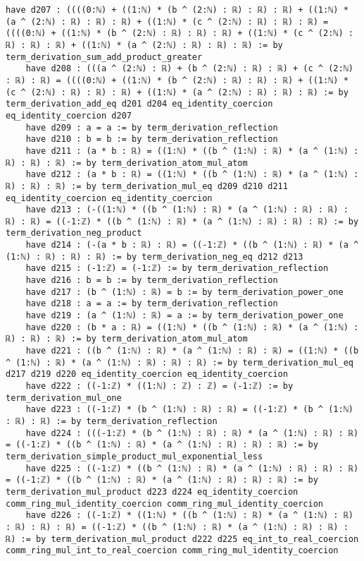 \documentclass{article}
\begin{document}
\begin{tcolorbox}[colback=white!10, width=\linewidth]
\begin{lstlisting}[language=Lean4]
    have d207 : ((((0:ℕ) + ((1:ℕ) * (b ^ (2:ℕ) : ℝ) : ℝ) : ℝ) + ((1:ℕ) * (a ^ (2:ℕ) : ℝ) : ℝ) : ℝ) + ((1:ℕ) * (c ^ (2:ℕ) : ℝ) : ℝ) : ℝ) = ((((0:ℕ) + ((1:ℕ) * (b ^ (2:ℕ) : ℝ) : ℝ) : ℝ) + ((1:ℕ) * (c ^ (2:ℕ) : ℝ) : ℝ) : ℝ) + ((1:ℕ) * (a ^ (2:ℕ) : ℝ) : ℝ) : ℝ) := by term_derivation_sum_add_product_greater
    have d208 : (((a ^ (2:ℕ) : ℝ) + (b ^ (2:ℕ) : ℝ) : ℝ) + (c ^ (2:ℕ) : ℝ) : ℝ) = ((((0:ℕ) + ((1:ℕ) * (b ^ (2:ℕ) : ℝ) : ℝ) : ℝ) + ((1:ℕ) * (c ^ (2:ℕ) : ℝ) : ℝ) : ℝ) + ((1:ℕ) * (a ^ (2:ℕ) : ℝ) : ℝ) : ℝ) := by term_derivation_add_eq d201 d204 eq_identity_coercion eq_identity_coercion d207
    have d209 : a = a := by term_derivation_reflection
    have d210 : b = b := by term_derivation_reflection
    have d211 : (a * b : ℝ) = ((1:ℕ) * ((b ^ (1:ℕ) : ℝ) * (a ^ (1:ℕ) : ℝ) : ℝ) : ℝ) := by term_derivation_atom_mul_atom
    have d212 : (a * b : ℝ) = ((1:ℕ) * ((b ^ (1:ℕ) : ℝ) * (a ^ (1:ℕ) : ℝ) : ℝ) : ℝ) := by term_derivation_mul_eq d209 d210 d211 eq_identity_coercion eq_identity_coercion
    have d213 : (-((1:ℕ) * ((b ^ (1:ℕ) : ℝ) * (a ^ (1:ℕ) : ℝ) : ℝ) : ℝ) : ℝ) = ((-1:ℤ) * ((b ^ (1:ℕ) : ℝ) * (a ^ (1:ℕ) : ℝ) : ℝ) : ℝ) := by term_derivation_neg_product
    have d214 : (-(a * b : ℝ) : ℝ) = ((-1:ℤ) * ((b ^ (1:ℕ) : ℝ) * (a ^ (1:ℕ) : ℝ) : ℝ) : ℝ) := by term_derivation_neg_eq d212 d213
    have d215 : (-1:ℤ) = (-1:ℤ) := by term_derivation_reflection
    have d216 : b = b := by term_derivation_reflection
    have d217 : (b ^ (1:ℕ) : ℝ) = b := by term_derivation_power_one
    have d218 : a = a := by term_derivation_reflection
    have d219 : (a ^ (1:ℕ) : ℝ) = a := by term_derivation_power_one
    have d220 : (b * a : ℝ) = ((1:ℕ) * ((b ^ (1:ℕ) : ℝ) * (a ^ (1:ℕ) : ℝ) : ℝ) : ℝ) := by term_derivation_atom_mul_atom
    have d221 : ((b ^ (1:ℕ) : ℝ) * (a ^ (1:ℕ) : ℝ) : ℝ) = ((1:ℕ) * ((b ^ (1:ℕ) : ℝ) * (a ^ (1:ℕ) : ℝ) : ℝ) : ℝ) := by term_derivation_mul_eq d217 d219 d220 eq_identity_coercion eq_identity_coercion
    have d222 : ((-1:ℤ) * ((1:ℕ) : ℤ) : ℤ) = (-1:ℤ) := by term_derivation_mul_one
    have d223 : ((-1:ℤ) * (b ^ (1:ℕ) : ℝ) : ℝ) = ((-1:ℤ) * (b ^ (1:ℕ) : ℝ) : ℝ) := by term_derivation_reflection
    have d224 : (((-1:ℤ) * (b ^ (1:ℕ) : ℝ) : ℝ) * (a ^ (1:ℕ) : ℝ) : ℝ) = ((-1:ℤ) * ((b ^ (1:ℕ) : ℝ) * (a ^ (1:ℕ) : ℝ) : ℝ) : ℝ) := by term_derivation_simple_product_mul_exponential_less
    have d225 : ((-1:ℤ) * ((b ^ (1:ℕ) : ℝ) * (a ^ (1:ℕ) : ℝ) : ℝ) : ℝ) = ((-1:ℤ) * ((b ^ (1:ℕ) : ℝ) * (a ^ (1:ℕ) : ℝ) : ℝ) : ℝ) := by term_derivation_mul_product d223 d224 eq_identity_coercion comm_ring_mul_identity_coercion comm_ring_mul_identity_coercion
    have d226 : ((-1:ℤ) * ((1:ℕ) * ((b ^ (1:ℕ) : ℝ) * (a ^ (1:ℕ) : ℝ) : ℝ) : ℝ) : ℝ) = ((-1:ℤ) * ((b ^ (1:ℕ) : ℝ) * (a ^ (1:ℕ) : ℝ) : ℝ) : ℝ) := by term_derivation_mul_product d222 d225 eq_int_to_real_coercion comm_ring_mul_int_to_real_coercion comm_ring_mul_identity_coercion

\end{lstlisting}
\end{tcolorbox}
\end{document}
